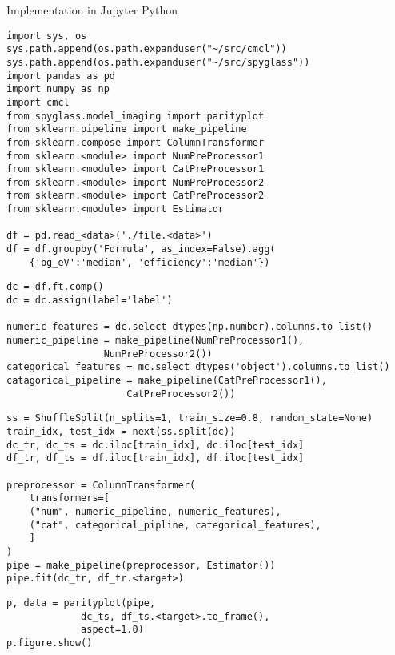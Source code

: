 \documentclass[10pt, compress]{beamer}
\begin{document}
\begin{frame}{Implementation in Jupyter Python}
 \tiny
{}
\begin{lstlisting}
import sys, os
sys.path.append(os.path.expanduser("~/src/cmcl"))
sys.path.append(os.path.expanduser("~/src/spyglass"))
import pandas as pd
import numpy as np
import cmcl
from spyglass.model_imaging import parityplot
from sklearn.pipeline import make_pipeline
from sklearn.compose import ColumnTransformer
from sklearn.<module> import NumPreProcessor1
from sklearn.<module> import CatPreProcessor1
from sklearn.<module> import NumPreProcessor2
from sklearn.<module> import CatPreProcessor2
from sklearn.<module> import Estimator

df = pd.read_<data>('./file.<data>')
df = df.groupby('Formula', as_index=False).agg(
    {'bg_eV':'median', 'efficiency':'median'})
\end{lstlisting}

\begin{lstlisting}
dc = df.ft.comp()
dc = dc.assign(label='label')

numeric_features = dc.select_dtypes(np.number).columns.to_list()
numeric_pipeline = make_pipeline(NumPreProcessor1(),
				 NumPreProcessor2())
categorical_features = mc.select_dtypes('object').columns.to_list()
catagorical_pipeline = make_pipeline(CatPreProcessor1(),
				     CatPreProcessor2())
\end{lstlisting}

\begin{lstlisting}
ss = ShuffleSplit(n_splits=1, train_size=0.8, random_state=None)
train_idx, test_idx = next(ss.split(dc))
dc_tr, dc_ts = dc.iloc[train_idx], dc.iloc[test_idx]
df_tr, df_ts = df.iloc[train_idx], df.iloc[test_idx]

preprocessor = ColumnTransformer(
    transformers=[
	("num", numeric_pipeline, numeric_features),
	("cat", categorical_pipline, categorical_features),
    ]
)
pipe = make_pipeline(preprocessor, Estimator())
pipe.fit(dc_tr, df_tr.<target>)
\end{lstlisting}

\begin{lstlisting}
p, data = parityplot(pipe,
		     dc_ts, df_ts.<target>.to_frame(),
		     aspect=1.0)
p.figure.show()
\end{lstlisting}
\end{frame}
\end{document}
